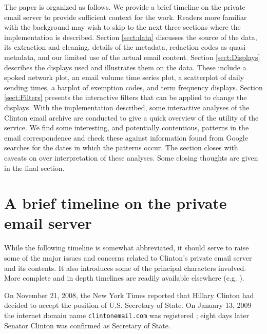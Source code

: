 \documentclass[journal]{vgtc}                %
\begin{document}
The paper is organized as follows.  We provide a brief timeline on the private email server to provide sufficient context for the work.  Readers more familiar with the background may wish to skip to the next three sections where the implementation is described.  Section \ref{sect:data} discusses the source of the data, its extraction and cleaning,  details of the metadata,  redaction codes as quasi-metadata,  and our limited use of the actual email content. 
Section \ref{sect:Displays} describes the displays used and illustrates them on the data. These include a spoked network plot, an email volume time series plot, a scatterplot of daily sending times, a barplot of exemption codes, and term frequency displays. Section \ref{sect:Filters} presents the interactive filters that can be applied to change the displays.  With the implementation described, some interactive analyses of the Clinton email archive are conducted to give a quick overview of the utility of the service.  We find some interesting, and potentially contentious, patterns in the email correspondence and check these against information found from Google searches for the dates in which the patterns occur.  The section closes with caveats on over interpretation of these analyses.  Some closing thoughts are given in the final section.

%
\section{A brief timeline on the private email server}
\label{sect:Timeline}
While the following timeline is somewhat abbreviated, it should serve to raise some of the major issues and concerns related to Clinton's private email server and its contents.  It also introduces some of the principal characters involved.  More complete and in depth timelines are readily available elsewhere (e.g. \cite{attkissonTimeline, thompsonTimeline, WashPostTimeline, clintonWikipedia, TimeMagEverything}).

On November 21, 2008, the New York Times reported that Hillary Clinton had decided to accept the position of U.S. Secretary of State.  On January 13, 2009 the internet domain name \texttt{clintonemail.com} was registered \cite{whoisClintonserver}; eight days later Senator Clinton was confirmed as Secretary of State.  
\end{document}
